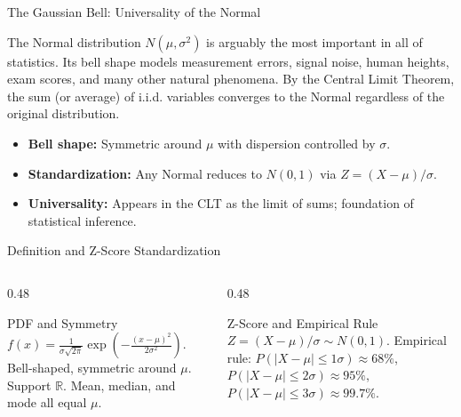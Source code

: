 \documentclass[aspectratio=169,xcolor={dvipsnames,table}]{beamer}
\begin{document}
\begin{frame}{The Gaussian Bell: Universality of the Normal}
	\footnotesize
	\begin{motivacion}
		The Normal distribution $N(\mu, \sigma^{2})$ is arguably the most important in all of statistics. Its bell shape models measurement errors, signal noise, human heights, exam scores, and many other natural phenomena. By the Central Limit Theorem, the sum (or average) of i.i.d. variables converges to the Normal regardless of the original distribution.
	\end{motivacion}
	\vspace{0.15cm}
	\pause
	\begin{itemize}\itemsep=0.1cm
		\item \textbf{Bell shape:} Symmetric around $\mu$ with dispersion controlled by $\sigma$. \pause
		\item \textbf{Standardization:} Any Normal reduces to $N(0,1)$ via $Z = (X-\mu)/\sigma$. \pause
		\item \textbf{Universality:} Appears in the CLT as the limit of sums; foundation of statistical inference.
	\end{itemize}
\end{frame}

\begin{frame}{Definition and Z-Score Standardization}
	\vspace{-0.15cm}
	\begin{columns}[T]
		\begin{column}{0.48\textwidth}
			\begin{block}{PDF and Symmetry}
				\footnotesize
				$f(x) = \frac{1}{\sigma\sqrt{2\pi}} \exp\left(-\frac{(x-\mu)^{2}}{2\sigma^{2}}\right)$. Bell-shaped, symmetric around $\mu$. Support $\mathbb{R}$. Mean, median, and mode all equal $\mu$.
			\end{block}
		\end{column}
		\begin{column}{0.48\textwidth}
			\begin{alertblock}{Z-Score and Empirical Rule}
				\footnotesize
				$Z = (X-\mu)/\sigma \sim N(0,1)$. Empirical rule: $P(|X-\mu| \le 1\sigma) \approx 68\%$, $P(|X-\mu| \le 2\sigma) \approx 95\%$, $P(|X-\mu| \le 3\sigma) \approx 99.7\%$.
			\end{alertblock}
		\end{column}
	\end{columns}
\end{frame}
\end{document}
